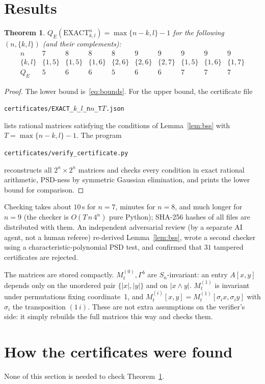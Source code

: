 \documentclass[11pt]{article}
\newtheorem{theorem}{Theorem}
\theoremstyle{remark}
\newcommand{\QE}{Q_E}
\newcommand{\EX}[3]{\mathrm{EXACT}_{#1,#2}^{#3}}
\begin{document}
\section{Results}
\begin{theorem}\label{thm:main}
$\QE(\EX{k}{l}{n})=\max\{n-k,l\}-1$ for the following $(n,\{k,l\})$ (and their complements):
\[\begin{array}{c|ccccccccc}
n & 7 & 8 & 8 & 8 & 9 & 9 & 9 & 9 & 9\\\hline
\{k,l\} & \{1,5\} & \{1,5\} & \{1,6\} & \{2,6\} & \{2,6\} & \{2,7\} & \{1,5\} & \{1,6\} & \{1,7\}\\
\QE & 5 & 6 & 6 & 5 & 6 & 6 & 7 & 7 & 7
\end{array}\]
\end{theorem}
\begin{proof}
The lower bound is~\eqref{eq:bounds}. For the upper bound, the certificate file
\begin{center}\texttt{certificates/EXACT\_$k$\_$l$\_n$n$\_T$T$.json}\end{center}
lists rational matrices satisfying the conditions of Lemma~\ref{lem:bss} with $T=\max\{n-k,l\}-1$. The
program
\begin{center}\texttt{certificates/verify\_certificate.py}\end{center}
reconstructs all $2^n\times2^n$ matrices and checks every condition in exact rational arithmetic,
PSD-ness by symmetric Gaussian elimination, and prints the lower bound for comparison.
\end{proof}
Checking takes about $10$\,s for $n=7$, minutes for $n=8$, and much longer for $n=9$ (the checker is
$O(T\,n\,4^n)$ pure Python); SHA-256 hashes of all files are distributed with them. An independent
adversarial review (by a separate AI agent, not a human referee) re-derived Lemma~\ref{lem:bss}, wrote a
second checker using a characteristic-polynomial PSD test, and confirmed that $31$ tampered certificates
are rejected.

The matrices are stored compactly. $M_t^{(0)},\Gamma^b$ are $S_n$-invariant: an entry $A[x,y]$ depends only on the
unordered pair $\{|x|,|y|\}$ and on $|x\wedge y|$. $M_t^{(1)}$ is invariant under permutations fixing coordinate~1, and
$M_t^{(i)}[x,y]=M_t^{(1)}[\sigma_ix,\sigma_iy]$ with $\sigma_i$ the transposition $(1\,i)$. These are not extra
assumptions on the verifier's side: it simply rebuilds the full matrices this way and checks them.

\section{How the certificates were found}
None of this section is needed to check Theorem~\ref{thm:main}.
\end{document}
